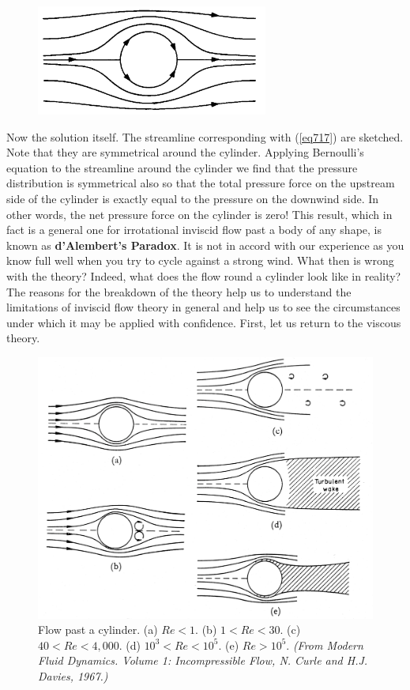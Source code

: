 \documentclass[10pt]{report}
\begin{document}
\begin{figure}
\centerline{\includegraphics[width=3in]{Section74.pdf}}
\caption{ }
\label{fig5.4}
\end{figure}

Now the solution itself. The streamline corresponding with (\ref{eq717}) are
sketched. Note that they are symmetrical around the cylinder. Applying
Bernoulli's equation to the streamline around the cylinder we find that the
pressure distribution is symmetrical also so that the total pressure force
on the upstream side of the cylinder is exactly equal to the pressure on the
downwind side. In other words, the net pressure force on the cylinder is
zero! This result, which in fact is a general one for irrotational inviscid
flow past a body of any shape, is known as \textbf{d'Alembert's Paradox}. It
is not in accord with our experience as you know full well when you try to
cycle against a strong wind. What then is wrong with the theory? Indeed,
what does the flow round a cylinder look like in reality? The reasons for
the breakdown of the theory help us to understand the limitations of
inviscid flow theory in general and help us to see the circumstances under
which it may be applied with confidence. First, let us return to the viscous
theory.

\begin{figure}[htbp]
\centerline{\includegraphics[width=5in]{Section75.pdf}}
\begin{center}
\end{center}
\caption{ Flow past a cylinder. (a) $Re < 1$. (b) $1< Re < 30$. (c) $40 < Re <
4,000$. (d) $10^{3} < Re < 10^{5}$. (e) $Re > 10^{5}$.
{\em (From Modern Fluid Dynamics. Volume 1: Incompressible Flow, N. Curle and H.J. Davies, 1967.)} }
\label{fig4.5}
\end{figure}
\end{document}
